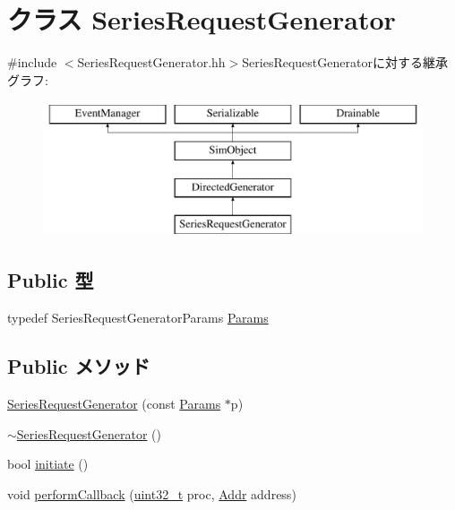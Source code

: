 \hypertarget{classSeriesRequestGenerator}{
\section{クラス SeriesRequestGenerator}
\label{classSeriesRequestGenerator}
}


{\ttfamily \#include $<$SeriesRequestGenerator.hh$>$}SeriesRequestGeneratorに対する継承グラフ:\begin{figure}[H]
\begin{center}
\leavevmode
\includegraphics[height=4cm]{classSeriesRequestGenerator}
\end{center}
\end{figure}
\subsection*{Public 型}
\begin{DoxyCompactItemize}
\item 
typedef SeriesRequestGeneratorParams \hyperlink{classSeriesRequestGenerator_a0f1dfc608e63d6aef0930883cc174b42}{Params}
\end{DoxyCompactItemize}
\subsection*{Public メソッド}
\begin{DoxyCompactItemize}
\item 
\hyperlink{classSeriesRequestGenerator_a6cd4d5ed278bfcc60352e3bbc8d0d21c}{SeriesRequestGenerator} (const \hyperlink{classSeriesRequestGenerator_a0f1dfc608e63d6aef0930883cc174b42}{Params} $\ast$p)
\item 
\hyperlink{classSeriesRequestGenerator_a1bcc0454580e7ed7665c3a514ea0d77b}{$\sim$SeriesRequestGenerator} ()
\item 
bool \hyperlink{classSeriesRequestGenerator_a4f5ee6a9e0c2962dfc0b4bb1978e6d28}{initiate} ()
\item 
void \hyperlink{classSeriesRequestGenerator_a8c30329193052bf044bac8ee3e075475}{performCallback} (\hyperlink{Type_8hh_a435d1572bf3f880d55459d9805097f62}{uint32\_\-t} proc, \hyperlink{base_2types_8hh_af1bb03d6a4ee096394a6749f0a169232}{Addr} address)
\end{DoxyCompactItemize}
